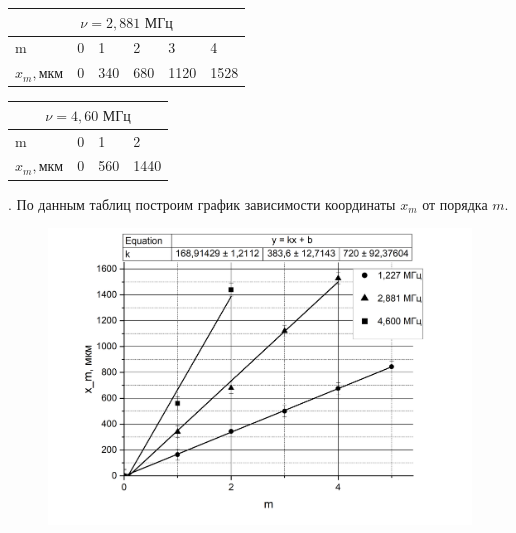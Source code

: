 \documentclass[a4paper,12pt]{article} %
\begin{document}
\begin{table}[!h]
\begin{tabular}{|llllll|}
\hline
\multicolumn{6}{|c|}{$\nu   = 2,881 \text{ МГц}$}                                                                                                         \\ \hline
\multicolumn{1}{|l|}{m}                 & \multicolumn{1}{l|}{0} & \multicolumn{1}{l|}{1}   & \multicolumn{1}{l|}{2}   & \multicolumn{1}{l|}{3}    & 4    \\ \hline
\multicolumn{1}{|l|}{$x_m, \text{мкм}$} & \multicolumn{1}{l|}{0} & \multicolumn{1}{l|}{340} & \multicolumn{1}{l|}{680} & \multicolumn{1}{l|}{1120} & 1528 \\ \hline
\end{tabular}
\end{table}

\newpage

\begin{table}[!h]
\begin{tabular}{|llll|}
\hline
\multicolumn{4}{|c|}{$\nu   = 4,60 \text{ МГц}$}                                                   \\ \hline
\multicolumn{1}{|l|}{m}                 & \multicolumn{1}{l|}{0} & \multicolumn{1}{l|}{1}   & 2    \\ \hline
\multicolumn{1}{|l|}{$x_m, \text{мкм}$} & \multicolumn{1}{l|}{0} & \multicolumn{1}{l|}{560} & 1440 \\ \hline
\end{tabular}
\end{table}

. По данным таблиц построим график зависимости координаты $x_m$ от порядка $m$.

\begin{figure}[!h]
 	\centering	\includegraphics[width=0.8\linewidth]{дифракция.png}
 \end{figure}
 
\end{document}
